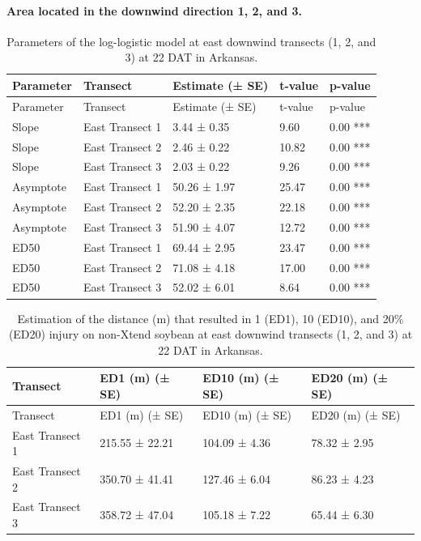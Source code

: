 \documentclass[]{article}
\let\oldparagraph\paragraph
\renewcommand{\paragraph}[1]{\oldparagraph{#1}\mbox{}}
\begin{document}
\pagebreak
\newpage

\paragraph{\texorpdfstring{Area located in the \textbf{downwind}
direction 1, 2, and
3.}{Area located in the downwind direction 1, 2, and 3.}}\label{area-located-in-the-downwind-direction-1-2-and-3.}

\begin{longtable}[]{@{}lllll@{}}
\caption{Parameters of the log-logistic model at east downwind transects
(1, 2, and 3) at 22 DAT in Arkansas.}\tabularnewline
\toprule
Parameter & Transect & Estimate (± SE) & t-value &
p-value\tabularnewline
\midrule
\endfirsthead
\toprule
Parameter & Transect & Estimate (± SE) & t-value &
p-value\tabularnewline
\midrule
\endhead
Slope & East Transect 1 & 3.44 ± 0.35 & 9.60 & 0.00 ***\tabularnewline
Slope & East Transect 2 & 2.46 ± 0.22 & 10.82 & 0.00 ***\tabularnewline
Slope & East Transect 3 & 2.03 ± 0.22 & 9.26 & 0.00 ***\tabularnewline
Asymptote & East Transect 1 & 50.26 ± 1.97 & 25.47 & 0.00
***\tabularnewline
Asymptote & East Transect 2 & 52.20 ± 2.35 & 22.18 & 0.00
***\tabularnewline
Asymptote & East Transect 3 & 51.90 ± 4.07 & 12.72 & 0.00
***\tabularnewline
ED50 & East Transect 1 & 69.44 ± 2.95 & 23.47 & 0.00 ***\tabularnewline
ED50 & East Transect 2 & 71.08 ± 4.18 & 17.00 & 0.00 ***\tabularnewline
ED50 & East Transect 3 & 52.02 ± 6.01 & 8.64 & 0.00 ***\tabularnewline
\bottomrule
\end{longtable}

\begin{longtable}[]{@{}llll@{}}
\caption{Estimation of the distance (m) that resulted in 1 (ED1), 10
(ED10), and 20\% (ED20) injury on non-Xtend soybean at east downwind
transects (1, 2, and 3) at 22 DAT in Arkansas.}\tabularnewline
\toprule
Transect & ED1 (m) (± SE) & ED10 (m) (± SE) & ED20 (m) (±
SE)\tabularnewline
\midrule
\endfirsthead
\toprule
Transect & ED1 (m) (± SE) & ED10 (m) (± SE) & ED20 (m) (±
SE)\tabularnewline
\midrule
\endhead
East Transect 1 & 215.55 ± 22.21 & 104.09 ± 4.36 & 78.32 ±
2.95\tabularnewline
East Transect 2 & 350.70 ± 41.41 & 127.46 ± 6.04 & 86.23 ±
4.23\tabularnewline
East Transect 3 & 358.72 ± 47.04 & 105.18 ± 7.22 & 65.44 ±
6.30\tabularnewline
\bottomrule
\end{longtable}
\end{document}
